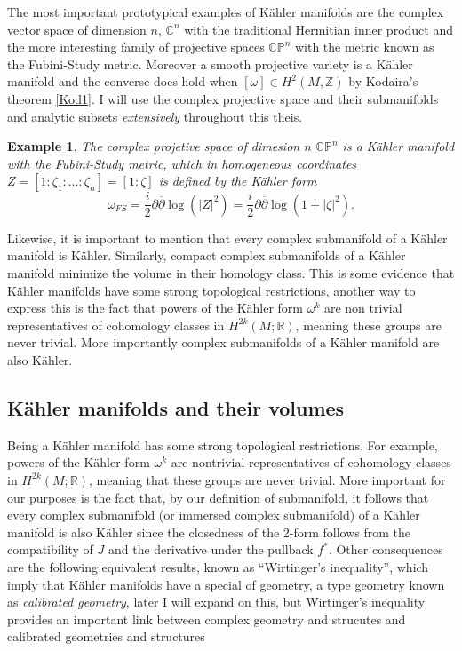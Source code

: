 \documentclass[12pt,twoside,a4paper]{report}
\newtheorem{example}{Example}
\newcommand{\zah}{\ensuremath{ \mathbb Z }}
\newcommand{\re}{\ensuremath{\mathbb R }}
\newcommand{\con}{\ensuremath{\mathbb{C}^n}}
\newcommand{\cp}{\ensuremath{\mathbb{CP}}}
\begin{document}
The most important prototypical examples of K\"ahler manifolds are the complex vector space of dimension $n$, $\con$ with the traditional Hermitian inner product and the more interesting family of projective spaces $\cp^{n}$ with the metric known as the Fubini-Study metric. Moreover a smooth projective variety is a Kähler manifold and the converse does hold when $[\omega]\in H^{2}(M,\zah)$ by Kodaira's theorem \ref{Kod1}. I will use the complex projective space and their submanifolds and analytic subsets \emph{extensively} throughout this theis.

\begin{example}
  The complex projetive space of dimesion $n$ $\cp^{n}$ is a Kähler manifold with the Fubini-Study metric, which in homogeneous coordinates $Z=[1:\zeta_{1}:\dots:\zeta_{n}]=[1:\zeta]$ is defined by the Kähler form
  \[
    \omega_{FS}=\frac{i}{2}\partial \overline{\partial}\log(|Z|^{2})=\frac{i}{2}\partial \overline{\partial}\log(1+|\zeta|^{2}).
  \]
\end{example}

Likewise, it is important to mention that every complex submanifold of a K\"ahler manifold is K\"ahler. Similarly, compact complex submanifolds of a K\"ahler manifold minimize the volume in their homology class. This is some evidence that Kähler manifolds have some strong topological restrictions, another way to express this is the fact that powers of the Kähler form $\omega^k$ are non trivial representatives of cohomology classes in $H^{2k}(M ;\re)$, meaning these groups are never trivial. More importantly complex submanifolds of a Kähler manifold are also K\"ahler.

\subsection{Kähler manifolds and their volumes}
Being a K\"ahler manifold has some strong topological restrictions. For example, powers of the K\"ahler form $\omega^k$ are nontrivial representatives of cohomology classes in $H^{2k}(M ;\re)$, meaning that these groups are never trivial.
More important for our purposes is the fact that, by our definition of submanifold, it follows that every complex submanifold (or immersed complex submanifold) of a K\"ahler manifold is also K\"ahler
since the closedness of the 2-form follows from the compatibility of $J$ and the derivative under the pullback $f^*$. Other consequences are the following equivalent results, known as ``Wirtinger's inequality'', which imply that Kähler manifolds have a special of geometry, a type geometry known as \emph{calibrated geometry}, later I will expand on this, but Wirtinger's inequality provides an important link between complex geometry and strucutes and calibrated geometries and structures
\end{document}
